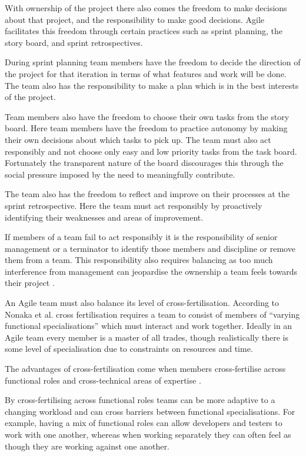 \documentclass[conference]{IEEEtran}
\begin{document}
With ownership of the project there also comes the freedom to make decisions
about that project, and the responsibility to make good decisions. Agile
facilitates this freedom through certain practices such as sprint planning,
the story board, and sprint retrospectives.

During sprint planning team members have the freedom to decide the direction of
the project for that iteration in terms of what features and work will be done.
The team also has the responsibility to make a plan which is in the best
interests of the project.

Team members also have the freedom to choose their own tasks from the story
board. Here team members have the freedom to practice autonomy by making their
own decisions about which tasks to pick up. The team must also act responsibly
and not choose only easy and low priority tasks from the task board. Fortunately
the transparent nature of the board discourages this through the social pressure
imposed by the need to meaningfully contribute.

The team also has the freedom to reflect and improve on their processes at the
sprint retrospective. Here the team must act responsibly by proactively
identifying their weaknesses and areas of improvement.

If members of a team fail to act responsibly it is the responsibility of senior
management or a terminator \cite{hoda2010organizing} to identify those members
and discipline or remove them from a team. This responsibility also requires
balancing as too much interference from management can jeopardise the ownership
a team feels towards their project \cite{hoda2010balancing}.

An Agile team must also balance its level of cross-fertilisation. According to
Nonaka et al. cross fertilisation requires a team to consist of members of
``varying functional specialisations'' which must interact and work together.
Ideally in an Agile team every member is a master of all trades, though
realistically there is some level of specialisation due to constraints on
resources and time.

The advantages of cross-fertilisation come when members cross-fertilise across
functional roles and cross-technical areas of expertise
\cite{hoda2010balancing}.

By cross-fertilising across functional roles teams can be more adaptive to a
changing workload and can cross barriers between functional specialisations. For
example, having a mix of functional roles can allow developers and testers to
work with one another, whereas when working separately they can often feel as
though they are working against one another.
\end{document}
